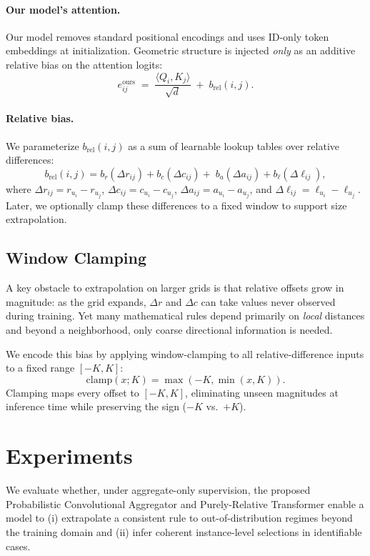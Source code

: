 \documentclass{article}
\theoremstyle{plain}
\theoremstyle{definition}
\theoremstyle{remark}
\begin{document}
\paragraph{Our model's attention.}
Our model removes standard positional encodings and uses ID-only token embeddings at initialization.
Geometric structure is injected \emph{only} as an additive relative bias on the attention logits:
\[
e^{\mathrm{ours}}_{ij} \;=\; \frac{\langle Q_i, K_j\rangle}{\sqrt{d}} \;+\; b_{\mathrm{rel}}(i,j).
\]

\paragraph{Relative bias.}
We parameterize $b_{\mathrm{rel}}(i,j)$ as a sum of learnable lookup tables over relative differences:
\[
b_{\mathrm{rel}}(i,j)=
b_{r}(\Delta r_{ij}) + b_{c}(\Delta c_{ij})+\; b_{a}(\Delta a_{ij}) + b_{\ell}(\Delta \ell_{ij}),
\]
where $\Delta r_{ij}=r_{u_i}-r_{u_j}$, $\Delta c_{ij}=c_{u_i}-c_{u_j}$,
$\Delta a_{ij}=a_{u_i}-a_{u_j}$, and $\Delta \ell_{ij}=\ell_{u_i}-\ell_{u_j}$.
Later, we optionally clamp these differences to a fixed window to support size extrapolation.
\subsection{Window Clamping}
\label{sec:clamping}

A key obstacle to extrapolation on larger grids is that relative offsets grow in magnitude: as the grid expands, $\Delta r$ and $\Delta c$ can take values never observed during training. Yet many mathematical rules depend primarily on \emph{local} distances and beyond a neighborhood, only coarse directional information is needed.

We encode this bias by applying window-clamping to all relative-difference inputs to a fixed range $[-K,K]$:
\[
\mathrm{clamp}(x;K) = \max(-K,\min(x,K)).
\]
Clamping maps every offset to $[-K,K]$, eliminating unseen magnitudes at inference time while preserving the sign ($-K$ vs.\ $+K$).

\section{Experiments}
\label{sec:experiments}
	
We evaluate whether, under aggregate-only supervision, the proposed Probabilistic Convolutional Aggregator and Purely-Relative Transformer enable a model to (i) extrapolate a consistent rule to out-of-distribution regimes beyond the training domain and (ii) infer coherent instance-level selections in identifiable cases.
\end{document}
